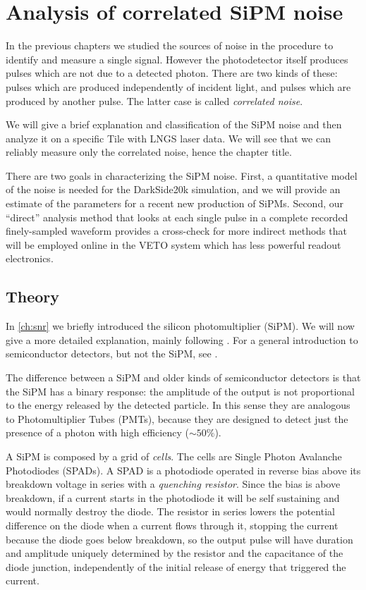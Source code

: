 \chapter{Analysis of correlated SiPM noise}
\label{ch:anal}

In the previous chapters we studied the sources of noise in the procedure to
identify and measure a single signal. However the photodetector itself produces
pulses which are not due to a detected photon. There are two kinds of these:
pulses which are produced independently of incident light, and pulses which are
produced by another pulse. The latter case is called \emph{correlated noise}.

We will give a brief explanation and classification of the SiPM noise and then
analyze it on a specific Tile with LNGS laser data. We will see that we can
reliably measure only the correlated noise, hence the chapter title.

There are two goals in characterizing the SiPM noise. First, a quantitative
model of the noise is needed for the DarkSide20k simulation, and we will
provide an estimate of the parameters for a recent new production of SiPMs.
Second, our ``direct'' analysis method that looks at each single pulse in a
complete recorded finely-sampled waveform provides a cross-check for more
indirect methods that will be employed online in the VETO system which has less
powerful readout electronics.

\section{Theory}
\label{sec:analtheory}

In \autoref{ch:snr} we briefly introduced the silicon photomultiplier (SiPM).
We will now give a more detailed explanation, mainly following
\cite[ch.~3]{savarese2018}. For a general introduction to semiconductor
detectors, but not the SiPM, see \cite[ch.~11]{knoll2010}.

The difference between a SiPM and older kinds of semiconductor detectors is
that the SiPM has a binary response: the amplitude of the output is not
proportional to the energy released by the detected particle. In this sense
they are analogous to Photomultiplier Tubes (PMTs), because they are designed
to detect just the presence of a photon with high efficiency ($\sim\SI{50}\%$).

A SiPM is composed by a grid of \emph{cells}. The cells are Single Photon
Avalanche Photodiodes (SPADs). A SPAD is a photodiode operated in reverse bias
above its breakdown voltage in series with a \emph{quenching resistor}. Since
the bias is above breakdown, if a current starts in the photodiode it will be
self sustaining and would normally destroy the diode. The resistor in series
lowers the potential difference on the diode when a current flows through it,
stopping the current because the diode goes below breakdown, so the output
pulse will have duration and amplitude uniquely determined by the resistor and
the capacitance of the diode junction, independently of the initial release of
energy that triggered the current.

